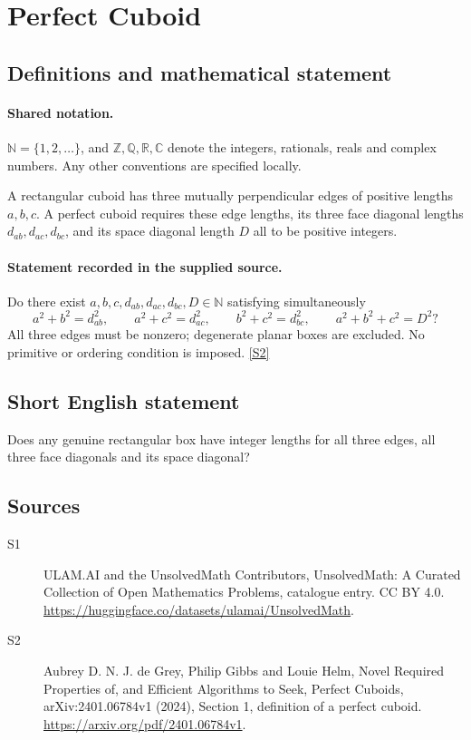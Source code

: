 \documentclass[11pt]{article}
\newcommand{\sref}[2]{\hyperlink{source:#1:#2}{[S#2]}}
\begin{document}
\section{Perfect Cuboid}\label{statement}

\subsection{Definitions and mathematical statement}

\paragraph{Shared notation.}$\mathbb N=\{1,2,\ldots\}$, and $\mathbb Z,\mathbb Q,\mathbb R,\mathbb C$ denote the integers, rationals, reals and complex numbers. Any other conventions are specified locally.


A rectangular cuboid has three mutually perpendicular edges of positive lengths $a,b,c$. A perfect cuboid requires these edge lengths, its three face diagonal lengths $d_{ab},d_{ac},d_{bc}$, and its space diagonal length $D$ all to be positive integers.
\paragraph{Statement recorded in the supplied source.}
Do there exist $a,b,c,d_{ab},d_{ac},d_{bc},D\in\mathbb N$ satisfying simultaneously
\[
 a^2+b^2=d_{ab}^2,\qquad a^2+c^2=d_{ac}^2,\qquad b^2+c^2=d_{bc}^2,
 \qquad a^2+b^2+c^2=D^2?
\]
All three edges must be nonzero; degenerate planar boxes are excluded. No primitive or ordering condition is imposed. \sref{statement}{2}
\subsection{Short English statement}
Does any genuine rectangular box have integer lengths for all three edges, all three face diagonals and its space diagonal?
\subsection{Sources}
\begin{description}
\item[\hypertarget{source:statement:1}{S1}] ULAM.AI and the UnsolvedMath Contributors, UnsolvedMath: A Curated Collection of Open Mathematics Problems, catalogue entry. CC BY 4.0. \url{https://huggingface.co/datasets/ulamai/UnsolvedMath}.
\item[\hypertarget{source:statement:2}{S2}] Aubrey D. N. J. de Grey, Philip Gibbs and Louie Helm, Novel Required Properties of, and Efficient Algorithms to Seek, Perfect Cuboids, arXiv:2401.06784v1 (2024), Section 1, definition of a perfect cuboid. \url{https://arxiv.org/pdf/2401.06784v1}.
\end{description}
\label{end:statement}
\end{document}
